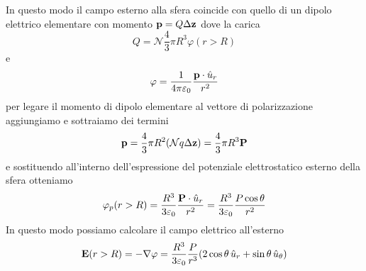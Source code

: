 In questo modo il campo esterno alla sfera coincide con quello di un dipolo elettrico elementare con momento $\bold{p} = Q \Delta \bold{z}$ dove la carica 
\begin{equation*}
	Q = \mathcal{N} \frac{4}{3} \pi R^3 \varphi(r>R)	
\end{equation*}
e
\begin{equation*}
	\varphi = \frac{1}{4 \pi \varepsilon_0} \frac{\bold{p} \cdot \hat{u}_{r}}{r^2}
\end{equation*}
per legare il momento di dipolo elementare al vettore di polarizzazione aggiungiamo e sottraiamo dei termini
\begin{equation*}
	\bold{p} = \frac{4}{3}\pi R^2(\mathcal{N}q \Delta \bold{z}) = \frac{4}{3} \pi R^3 \bold{P}
\end{equation*}
e sostituendo all'interno dell'espressione del potenziale elettrostatico esterno della sfera otteniamo 
\begin{equation*}
	\varphi_{p} (r > R) = \frac{R^3}{3	\varepsilon_0} \frac{\bold{P} \cdot \hat{u}_{r}}{r^2} = \frac{R^3}{3 \varepsilon_0} \frac{P \cos\theta }{r^2}
\end{equation*} 
In questo modo possiamo calcolare il campo elettrico all'esterno 
\begin{equation*}
	\bold{E}(r>R) = - \nabla \varphi = \frac{R^3}{3 \varepsilon_0} \frac{P}{r^3} (2 \cos \theta \,\hat{u}_{r} + \sin \theta \, \hat{u}_{\theta})
\end{equation*}

